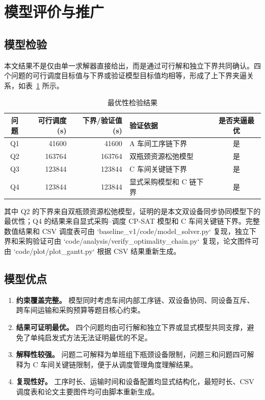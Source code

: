 \section{模型评价与推广}

\subsection{模型检验}

本文结果不是仅由单一求解器直接给出，而是通过可行解和独立下界共同确认。四个问题的可行调度目标值与下界或验证模型目标值均相等，形成了上下界夹逼关系，如表~\ref{tab:optimality-check} 所示。

\begin{table}[!htbp]
  \centering
  \caption{最优性检验结果}
  \label{tab:optimality-check}
  \renewcommand{\arraystretch}{1.2}
  \begin{tabularx}{\textwidth}{c r r X c}
    \toprule
    问题 & 可行调度(s) & 下界/验证值(s) & 验证依据 & 是否夹逼最优 \\
    \midrule
    Q1 & 41600 & 41600 & A 车间工序链下界 & 是 \\
    Q2 & 163764 & 163764 & 双瓶颈资源松弛模型 & 是 \\
    Q3 & 123844 & 123844 & C 车间关键链下界 & 是 \\
    Q4 & 123844 & 123844 & 显式采购模型和 C 链下界 & 是 \\
    \bottomrule
  \end{tabularx}
\end{table}

其中 Q2 的下界来自双瓶颈资源松弛模型，证明的是本文双设备同步协同模型下的最优性；Q4 的结果来自显式采购--调度 CP-SAT 模型和 C 车间关键链下界。完整数值结果和 CSV 调度表可由 `baseline\_v1/code/model\_solver.py` 复现，独立下界和采购验证可由 `code/analysis/verify\_optimality\_chain.py` 复现，论文图件可由 `code/plot/plot\_gantt.py` 根据 CSV 结果重新生成。

\subsection{模型优点}

\begin{enumerate}
  \item \textbf{约束覆盖完整。} 模型同时考虑车间内部工序链、双设备协同、同设备互斥、跨车间运输和采购预算等题目核心约束。
  \item \textbf{结果可证明最优。} 四个问题均由可行解和独立下界或显式模型共同支撑，避免了单纯启发式方法无法证明最优的不足。
  \item \textbf{解释性较强。} 问题二可解释为单班组下瓶颈设备限制，问题三和问题四可解释为 C 车间关键链限制，便于从调度管理角度理解结果。
  \item \textbf{复现性好。} 工序时长、运输时间和设备配置均显式结构化，最短时长、CSV 调度表和论文主要图件均可由脚本重新生成。
\end{enumerate}

